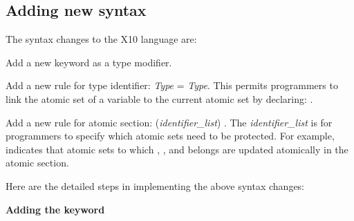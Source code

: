 \documentclass{article}
\begin{document}
\subsection{Adding new syntax}
\label{sec:keyword}

The syntax changes to the X10 language are:

\begin{itemize}

\Item Add a new keyword  as a type modifier.

\Item Add a new rule for type identifier:  \textit{Type} =  \textit{Type}. This permits programmers to link the atomic set of a variable to the current  atomic set by declaring: .

\Item Add a new rule for atomic section: (\textit{identifier\_list})  . The \textit{identifier\_list} is  for programmers to specify which atomic sets need to be protected. For example,  indicates that atomic sets to which , , and  belongs are updated atomically in the atomic section.

\end{itemize}

Here are the detailed steps in implementing the above syntax changes:

\textbf{Adding the  keyword}
\end{document}
